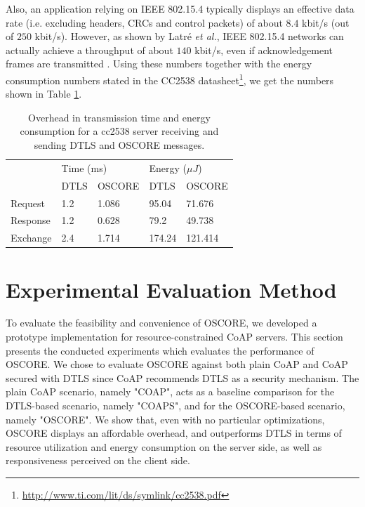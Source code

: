 {Also, an application relying on IEEE 802.15.4 typically displays an effective data rate (i.e. excluding headers, CRCs and control packets) of about $8.4$ kbit/s (out of $250$ kbit/s). However, as shown by Latr\'{e} \emph{et al.}, IEEE 802.15.4 networks can actually achieve a throughput of about $140$ kbit/s, even if acknowledgement frames are transmitted \cite{latre:2005}. Using these numbers together with the energy consumption numbers stated in the CC2538 datasheet\footnote{\url{http://www.ti.com/lit/ds/symlink/cc2538.pdf}}, we get the numbers shown in Table \ref{tab:overhead}.
\begin{table}[ht]
\center

\begin{tabular}{l|ll|ll}
         & \multicolumn{2}{l}{Time (ms)} & \multicolumn{2}{l}{Energy ($\mu J$)} \\ 
         & DTLS         & OSCORE         & DTLS                   & OSCORE                  \\ \hline
Request  & 1.2          & 1.086          & 95.04                  & 71.676                  \\
Response & 1.2          & 0.628          & 79.2                   & 49.738                  \\
Exchange & 2.4          & 1.714          & 174.24                 & 121.414                

\end{tabular}
\caption{Overhead in transmission time and energy consumption for a cc2538 server receiving and sending DTLS and OSCORE messages.}
\label{tab:overhead}
\end{table}

\section{Experimental Evaluation Method}
\label{sec:measure}

To evaluate the feasibility and convenience of OSCORE, we developed a prototype implementation for resource-constrained CoAP servers. This section presents the conducted experiments which evaluates the performance of OSCORE. We chose to evaluate OSCORE against both plain CoAP and CoAP secured with DTLS since CoAP recommends DTLS as a security mechanism. The plain CoAP scenario, namely "COAP", acts as a baseline comparison for the DTLS-based scenario, namely "COAPS", and for the OSCORE-based scenario, namely "OSCORE". We show that, even with no particular optimizations, OSCORE displays an affordable overhead, and outperforms DTLS in terms of resource utilization and energy consumption on the server side, as well as responsiveness perceived on the client side.

}
